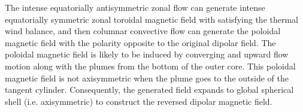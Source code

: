 The intense equatorially antisymmetric zonal flow can generate intense equatorially symmetric zonal toroidal magnetic field with satisfying the thermal wind balance, and then columnar convective flow can generate the poloidal magnetic field with the polarity opposite to the original dipolar field.
The poloidal magnetic field is likely to be induced by converging and upward flow motion along with the plumes from the bottom of the outer core.
This poloidal magnetic field is not axisymmetric when the plume goes to the outside of the tangent cylinder. 
Consequently, the generated field expands to global spherical shell (i.e. axisymmetric) to construct the reversed dipolar magnetic field.
%
%
%

